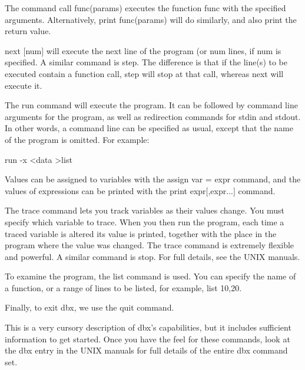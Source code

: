 The command {\cd call {\ms func\/}({\ms params\/})} executes the
function {\ms func\/} with the specified arguments. Alternatively,
{\cd print {\ms func\/}({\ms params\/})} will do similarly, and
also print the return value.

{\cd next} {\ms $[$num\/$]$} will execute the next line of the program (or
{\ms num\/} lines, if {\ms num\/} is specified. A similar command is {\cd
step}. The difference is that if the line(s) to be executed contain a
function call, {\cd step} will stop at that call, whereas {\cd next}
will execute it.

The {\cd run} command will execute the program. It can be followed by
command line arguments for the program, as well as redirection
commands for {\fn stdin} and {\fn stdout}. In other words, a command
line can be specified as usual, except that the name of the program
is omitted.  For example:
 \begin{code}
run -x <data >list
\end{code}
\noindent
 Values can be assigned to variables with the {\cd assign {\ms var\/} =
{\ms expr\/}} command, and the values of expressions can be printed with the
{\cd print }{\ms expr\/$[$,expr...$]$} command.

The {\cd trace} command lets you track variables as their values
change. You must specify which variable to trace. When you then run
the program, each time a traced variable is altered its value is
printed, together with the place in the program where the value was
changed. The {\cd trace} command is extremely flexible and powerful.
A similar command is {\cd stop}. For full details, see the UNIX
manuals.

To examine the program, the {\cd list} command is used. You can
specify the name of a function, or a range of lines to be listed,
for example, {\cd list 10,20}.

Finally, to exit {\cmd dbx}, we use the {\cd quit} command.

This is a very cursory description of {\cmd dbx}'s capabilities, but
it includes sufficient information to get started. Once you have the
feel for these commands, look at the {\cmd dbx} entry in the UNIX
manuals for full details of the entire {\cmd dbx} command set.

